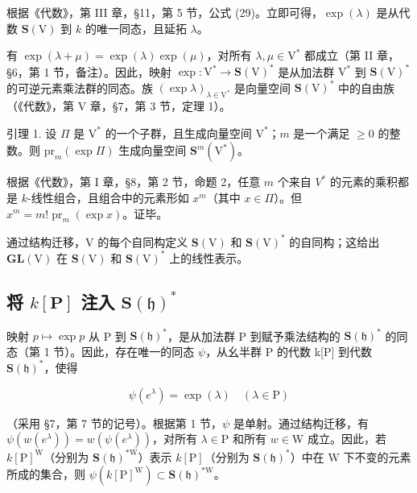 根据《代数》，第 III 章，§11，第 5 节，公式 (29)。立即可得，\(\exp(\lambda)\) 是从代数 \(\mathbf{S}(\mathrm{V})\) 到 \(k\) 的唯一同态，且延拓 \(\lambda\)。

有 \(\exp (\lambda +\mu) = \exp (\lambda)\exp (\mu)\)，对所有 \(\lambda ,\mu \in \mathrm{V}^{*}\) 都成立（第 II 章，§6，第 1 节，备注）。因此，映射 \(\exp :\mathrm{V}^{*}\to \mathbf{S}(\mathrm{V})^{*}\) 是从加法群 \(\mathrm{V}^*\) 到 \(\mathbf{S}(\mathrm{V})^{*}\) 的可逆元素乘法群的同态。族 \((\exp \lambda)_{\lambda \in \mathrm{V}^{*}}\) 是向量空间 \(\mathbf{S}(\mathrm{V})^{*}\) 中的自由族（《代数》，第 V 章，§7，第 3 节，定理 1）。

引理 1. 设 \(\Pi\) 是 \(\mathrm{V}^*\) 的一个子群，且生成向量空间 \(\mathrm{V}^*\)；\(m\) 是一个满足 \(\geq 0\) 的整数。则 \(\mathrm{pr}_m(\exp \Pi)\) 生成向量空间 \(\mathbf{S}^m (\mathrm{V}^*)\)。

根据《代数》，第 I 章，§8，第 2 节，命题 2，任意 \(m\) 个来自 \(V^{*}\) 的元素的乘积都是 \(k\)-线性组合，且组合中的元素形如 \(x^{m}\)（其中 \(x \in \Pi\)）。但 \(x^{m} = m! \operatorname{pr}_{m}(\exp x)\)。证毕。

通过结构迁移，V 的每个自同构定义 \(\mathbf{S}(\mathrm{V})\) 和 \(\mathbf{S}(\mathrm{V})^{*}\) 的自同构；这给出 \(\mathbf{GL}(\mathrm{V})\) 在 \(\mathbf{S}(\mathrm{V})\) 和 \(\mathbf{S}(\mathrm{V})^{*}\) 上的线性表示。

\subsection{\texorpdfstring{将 \(k[\mathbf{P}]\) 注入 \(\mathbf{S}(\mathfrak{h})^{*}\)}{将 k{[}\textbackslash mathbf\{P\}{]} 注入 \textbackslash mathbf\{S\}(\textbackslash mathfrak\{h\})\^{}\{*\}}}

映射 \(p \mapsto \exp p\) 从 P 到 \(\mathbf{S}(\mathfrak{h})^{*}\)，是从加法群 P 到赋予乘法结构的 \(\mathbf{S}(\mathfrak{h})^{*}\) 的同态（第 1 节）。因此，存在唯一的同态 \(\psi\)，从幺半群 P 的代数 k{[}P{]} 到代数 \(\mathbf{S}(\mathfrak{h})^{*}\)，使得

\[
\psi (e ^ {\lambda}) = \exp (\lambda) \quad (\lambda \in \mathrm{P})
\]

（采用 §7，第 7 节的记号）。根据第 1 节，\(\psi\) 是单射。通过结构迁移，有 \(\psi(w(e^{\lambda})) = w(\psi(e^{\lambda}))\)，对所有 \(\lambda \in \mathrm{P}\) 和所有 \(w \in \mathrm{W}\) 成立。因此，若 \(k[\mathrm{P}]^{\mathrm{W}}\)（分别为 \(\mathbf{S}(\mathfrak{h})^{*\mathrm{W}}\)）表示 \(k[\mathrm{P}]\)（分别为 \(\mathbf{S}(\mathfrak{h})^{*}\)）中在 \(\mathrm{W}\) 下不变的元素所成的集合，则 \(\psi(k[\mathrm{P}]^{\mathrm{W}}) \subset \mathbf{S}(\mathfrak{h})^{*\mathrm{W}}\)。

